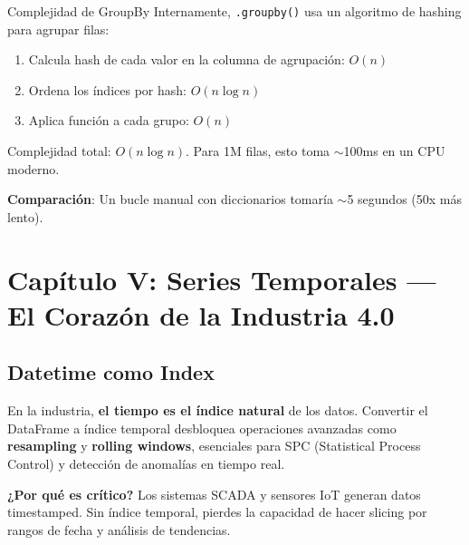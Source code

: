 \documentclass[11pt, a4paper]{article}
\begin{document}
\begin{sciencebox}{Complejidad de GroupBy}
Internamente, \texttt{.groupby()} usa un algoritmo de hashing para agrupar filas:
\begin{enumerate}
    \item Calcula hash de cada valor en la columna de agrupación: \( O(n) \)
    \item Ordena los índices por hash: \( O(n \log n) \)
    \item Aplica función a cada grupo: \( O(n) \)
\end{enumerate}

Complejidad total: \( O(n \log n) \). Para 1M filas, esto toma $\sim$100ms en un CPU moderno.

\textbf{Comparación}: Un bucle manual con diccionarios tomaría $\sim$5 segundos (50x más lento).
\end{sciencebox}

\newpage
\section{Capítulo V: Series Temporales — El Corazón de la Industria 4.0}

\subsection{Datetime como Index}

En la industria, \textbf{el tiempo es el índice natural} de los datos. Convertir el DataFrame a índice temporal desbloquea operaciones avanzadas como \textbf{resampling} y \textbf{rolling windows}, esenciales para SPC (Statistical Process Control) y detección de anomalías en tiempo real.

\textbf{¿Por qué es crítico?} Los sistemas SCADA y sensores IoT generan datos timestamped. Sin índice temporal, pierdes la capacidad de hacer slicing por rangos de fecha y análisis de tendencias.
\end{document}

